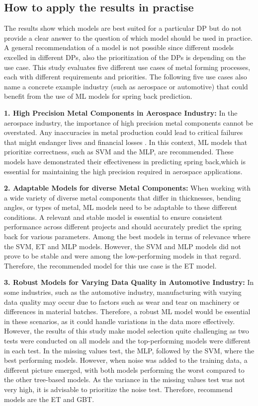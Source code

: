 \subsection{How to apply the results in practise}\label{subsec:how-to-apply-the-results-in-practise}
The results show which models are best suited for a particular \ac{DP} but do not provide a clear answer to the
question of which model should be used in practice.
A general recommendation of a model is not possible since different models excelled in different \ac{DP}s, also the
prioritization of the \ac{DP}s is depending on the use case.
This study evaluates five different use cases of metal forming processes, each with different requirements and
priorities.
The following five use cases also name a concrete example industry (such as aerospace or automotive) that
could
benefit from the use of \ac{ML} models for spring back prediction.


\textbf{1. High Precision Metal Components in Aerospace Industry:}
In the aerospace industry, the importance of high precision metal components cannot be overstated.
Any inaccuracies in metal production could lead to critical failures that might endanger lives and financial
losses .
In this context, ML models that prioritize correctness, such as \ac{SVM} and the \ac{MLP}, are recommended.
These models have demonstrated their effectiveness in predicting spring back,which is essential for maintaining the
high precision required in aerospace applications.


\textbf{2. Adaptable Models for diverse Metal Components:}
When working with a wide variety of diverse metal components that differ in thicknesses, bending angles, or types of
metal, ML models need to be adaptable to these different conditions.
A relevant and stable model is essential to ensure consistent performance across different projects and should
accurately
predict the spring back for various parameters.
Among the best models in terms of relevance where the SVM, ET and MLP models.
However, the SVM and MLP models did not prove to be stable and were among the low-performing models in that regard.
Therefore, the recommended model for this use case is the ET model.


\textbf{3. Robust Models for Varying Data Quality in Automotive Industry:}
In some industries, such as the automotive industry, manufacturing with varying data quality may occur due to
factors
such as wear and tear on machinery or differences in material batches.
Therefore, a robust ML model would be essential in these scenarios, as it could handle variations in the data more
effectively.
However, the results of this study make model selection quite challenging as two tests were conducted on all models
and the top-performing models were different in each test.
In the missing values test, the MLP, followed by the SVM, where the best performing models.
However, when noise was added to the training data, a different picture emerged, with both models
performing the worst compared to the other tree-based models.
As the variance in the missing values test was not very
high,  it is advisable to prioritize the noise test.
Therefore, recommend models are the ET and GBT.


